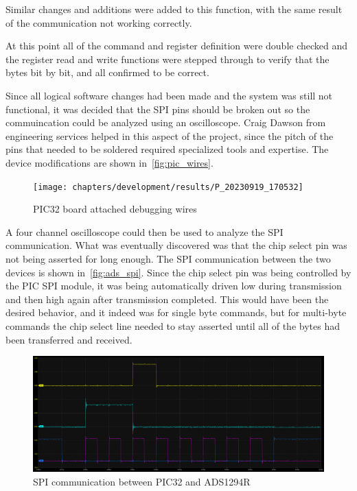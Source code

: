 Similar changes and additions were added to this function, with the same result of the communication not working correctly.

At this point all of the command and register definition were double checked and
the register read and write functions were stepped through to verify that the bytes bit by bit, and all confirmed to be correct.

Since all logical software changes had been made and the system was still not functional,
it was decided that the SPI pins should be broken out so the commuincation could be analyzed using an oscilloscope.
Craig Dawson from engineering services helped in this aspect of the project,
since the pitch of the pins that needed to be soldered required specialized tools and expertise.
The device modifications are shown in~\autoref{fig:pic_wires}.

\begin{figure}[!ht]
  \caption{PIC32 board attached debugging wires}\label{fig:pic_wires}
  \centering
  \texttt{[image: chapters/development/results/P\_20230919\_170532]}
\end{figure}


A four channel oscilloscope could then be used to analyze the SPI communication.
What was eventually discovered was that the chip select pin was not being asserted for long enough.
The SPI communication between the two devices is shown in~\autoref{fig:ads_spi}.
Since the chip select pin was being controlled by the PIC SPI module,
it was being automatically driven low during transmission and then high again after transmission completed.
This would have been the desired behavior, and it indeed was for single byte commands,
but for multi-byte commands the chip select line needed to stay asserted until all of the bytes had been transferred and received.

\begin{figure}[!ht]
  \caption{SPI communication between PIC32 and ADS1294R}\label{fig:ads_spi}
  \centering
  \includegraphics[width=1\columnwidth]{chapters/development/results/ADS_SPI_COMMS}
\end{figure}

